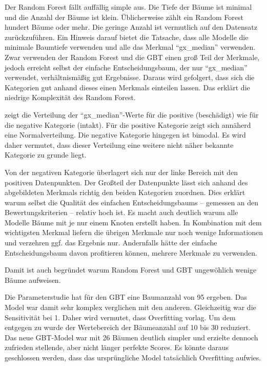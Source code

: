 Der Random Forest fällt auffällig simple aus. Die Tiefe der Bäume ist minimal und die Anzahl der Bäume ist klein. Üblicherweise zählt ein Random Forest hundert Bäume oder mehr. Die geringe Anzahl ist vermutlich auf den Datensatz zurückzuführen. Ein Hinweis darauf bietet die Tatsache, dass alle Modelle die minimale Baumtiefe verwenden und alle das Merkmal \enquote{gx\_median} verwenden. Zwar verwenden der Random Forest und die GBT einen groß Teil der Merkmale, jedoch erreicht selbst der einfache Entscheidungsbaum, der nur \enquote{gx\_median} verwendet, verhältnismäßig gut Ergebnisse. Daraus wird gefolgert, dass sich die Kategorien gut anhand dieses einen Merkmals einteilen lassen. Das erklärt die niedrige Komplexität des Random Forest.

 zeigt die Verteilung der \enquote{gx\_median}-Werte für die positive (beschädigt) wie für die negative Kategorie (intakt). Für die positive Kategorie zeigt sich annäherd eine Normalverteilung. Die negative Kategorie hingegen ist bimodal. Es wird daher vermutet, dass dieser Verteilung eine weitere nicht näher bekannte Kategorie zu grunde liegt.

Von der negativen Kategorie überlagert sich nur der linke Bereich mit den positiven Datenpunkten. Der Großteil der Datenpunkte lässt sich anhand des abgebildeten Merkmals richtig den beiden Kategorien zuordnen. Dies erklärt warum selbst die Qualität des einfachen Entscheidungsbaums -- gemessen an den Bewertungskriterien -- relativ hoch ist. Es macht auch deutlich warum alle Modelle Bäume mit je nur einem Knoten erstellt haben. In Kombination mit dem wichtigsten Merkmal liefern die übrigen Merkmale nur noch wenige Informationen und verzehren ggf. das Ergebnis nur. Andernfalls hätte der einfache Entscheidungsbaum davon profitieren können, mehrere Merkmale zu verwenden.

Damit ist auch begründet warum Random Forest und GBT ungewöhlich wenige Bäume aufweisen.

Die Parameterstudie hat für den GBT eine Baumanzahl von 95 ergeben. Das Model war damit sehr komplex verglichen mit den anderen. Gleichzeitig war die Sensitivität bei 1. Daher wird vermutet, dass Overfitting vorlag. Um dem entgegen zu wurde der Wertebereich der Bäumeanzahl auf 10 bis 30 reduziert. Das neue GBT-Model war mit 26 Bäumen deutlich simpler und erzielte dennoch zufrieden stellende, aber nicht länger perfekte Scores. Es könnte daraus geschlossen werden, dass das ursprüngliche Model tatsächlich Overfitting aufwies.